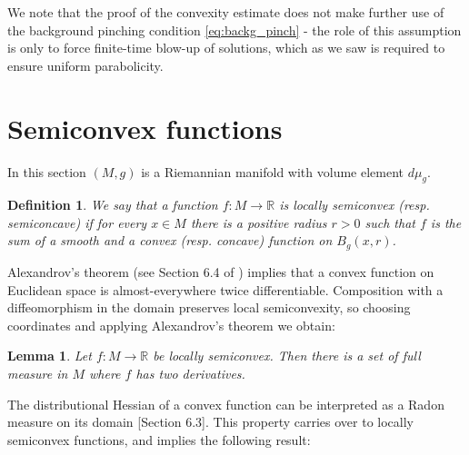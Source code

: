 \documentclass[12pt]{amsart}
\newtheorem{lemma}[theorem]{Lemma}
\newtheorem{definition}[theorem]{Definition}
\begin{document}
We note that the proof of the convexity estimate does not make further use of the background pinching condition \eqref{eq:backg_pinch} - the role of this assumption is only to force finite-time blow-up of solutions, which as we saw is required to ensure uniform parabolicity.

{\appendix

\section{Semiconvex functions}
\label{app:semiconvex}

In this section $(M,g)$ is a Riemannian manifold with volume element $d\mu_g$. 

\begin{definition}
We say that a function $f:M\to \mathbb{R}$ is locally semiconvex (resp. semiconcave) if for every $x \in M$ there is a positive radius $r >0$ such that $f$ is the sum of a smooth and a convex (resp. concave) function on $B_g(x,r)$. 
\end{definition}

Alexandrov's theorem (see Section 6.4 of \cite{Ev-Gar}) implies that a convex function on Euclidean space is almost-everywhere twice differentiable. Composition with a diffeomorphism in the domain preserves local semiconvexity, so choosing coordinates and applying Alexandrov's theorem we obtain:

\begin{lemma}
Let $f : M\to \mathbb{R}$ be locally semiconvex. Then there is a set of full measure in $M$ where $f$ has two derivatives.  
\end{lemma}

The distributional Hessian of a convex function can be interpreted as a Radon measure on its domain \cite{Ev-Gar}[Section 6.3]. This property carries over to locally semiconvex functions, and implies the following result:

}
\end{document}
